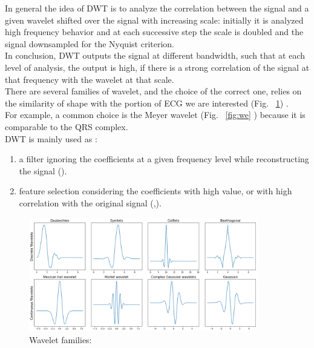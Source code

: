 \documentclass[LaM,binding=0.6cm]{sapthesis}
\begin{document}
In general the idea of DWT is to analyze the correlation between the signal and a given wavelet shifted over the signal with increasing scale: initially it is analyzed high frequency behavior and at each successive step the scale is doubled and the signal downsampled for the Nyquist criterion.\\In conclusion, DWT outputs the signal at different bandwidth, such that at each level of analysis, the output is high, if there is a strong correlation of the signal at that frequency with the wavelet at that scale.\\There are several families of wavelet, and the choice of the correct one, relies on the similarity of shape with the portion of ECG we are interested (Fig. ~\ref{fig:wf}) .\\For example, a common choice is the Meyer wavelet (Fig. ~\ref{fig:we} ) because it is comparable to the QRS complex.\\DWT is mainly used as :
\begin{enumerate}
\item a filter ignoring the coefficients at a given frequency level while reconstructing the signal (\cite{lnlf}).
\item feature selection considering the coefficients with high value, or with high correlation with the original signal (\cite{rfdwt},\cite{lnlf}).
\end{enumerate}
\begin{figure}[H]  \centering
	\includegraphics[width=100mm,scale=0.7]{waveletfamilies.png}
	\caption{Wavelet families: \cite{watut} }
	\label{fig:wf}
\end{figure}
\end{document}

